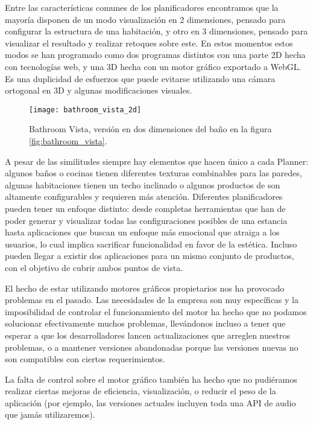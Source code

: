 Entre las características comunes de los planificadores encontramos que la mayoría disponen de un modo visualización en 2 dimensiones, pensado para configurar la estructura de una habitación, y otro en 3 dimensiones, pensado para visualizar el resultado y realizar retoques sobre este. En estos momentos estos modos se han programado como dos programas distintos con una parte 2D hecha con tecnologías web, y una 3D hecha con un motor gráfico exportado a WebGL. Es una duplicidad de esfuerzos que puede evitarse utilizando una cámara ortogonal en 3D y algunas modificaciones visuales.

\begin{figure}[H]
    \centering
    \texttt{[image: bathroom\_vista\_2d]}
    \caption{Bathroom Vista, versión en dos dimensiones del baño en la figura \ref{fig:bathroom_vista}.}
    \label{fig:bathroom_vista_2d}
\end{figure}

A pesar de las similitudes siempre hay elementos que hacen único a cada Planner: algunos baños o cocinas tienen diferentes texturas combinables para las paredes, algunas habitaciones tienen un techo inclinado o algunos productos de son altamente configurables y requieren más atención. Diferentes planificadores pueden tener un enfoque distinto: desde completas herramientas que han de poder generar y visualizar todas las configuraciones posibles de una estancia hasta aplicaciones que buscan un enfoque más emocional que atraiga a los usuarios, lo cual implica sacrificar funcionalidad en favor de la estética. Incluso pueden llegar a existir dos aplicaciones para un mismo conjunto de productos, con el objetivo de cubrir ambos puntos de vista.

El hecho de estar utilizando motores gráficos propietarios nos ha provocado problemas en el pasado. Las necesidades de la empresa son muy específicas y la imposibilidad de controlar el funcionamiento del motor ha hecho que no podamos solucionar efectivamente muchos problemas, llevándonos incluso a tener que esperar a que los desarrolladores lancen actualizaciones que arreglen nuestros problemas, o a mantener versiones abandonadas porque las versiones nuevas no son compatibles con ciertos requerimientos.

La falta de control sobre el motor gráfico también ha hecho que no pudiéramos realizar ciertas mejoras de eficiencia, visualización, o reducir el peso de la aplicación (por ejemplo, las versiones actuales incluyen toda una API de audio que jamás utilizaremos).

